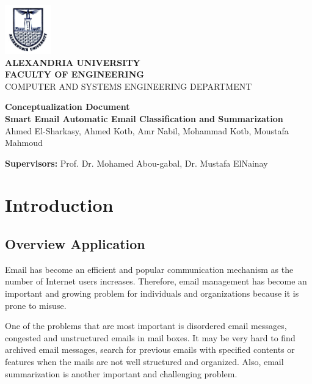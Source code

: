 \documentclass[a4paper,10pt]{article}
\begin{document}
\begin{titlepage}
\vspace{-1.5cm}
\begin{center}
\includegraphics[width=2cm]{Logo_Alexandria_University.jpg}\\
\vspace{1cm}
\textbf{\large ALEXANDRIA UNIVERSITY} \\
\textbf{FACULTY OF ENGINEERING} \\
{\small  COMPUTER AND SYSTEMS ENGINEERING DEPARTMENT}

\vspace{2.5cm}
\textbf{\LARGE Conceptualization Document}\\
\textbf{\small Smart Email Automatic Email Classification and Summarization}\\

\vspace{1cm}
{ Ahmed El-Sharkasy, Ahmed Kotb, Amr Nabil, Mohammad Kotb, Moustafa Mahmoud }
\end{center}

\vspace{1ex}
\textbf{Supervisors:} Prof. Dr. Mohamed Abou-gabal, Dr. Mustafa ElNainay
\end{titlepage}

\newpage
\tableofcontents
\newpage

\section{Introduction}

\subsection{Overview Application}
Email has become an efficient and popular communication mechanism as the number 
of Internet users increases. Therefore, email management has become an important 
and growing problem for individuals and organizations because it is prone to misuse.

One of the problems that are most important is disordered email messages, 
congested and unstructured emails in mail boxes. It may be very hard to 
find archived email messages, search for previous emails with specified contents 
or features when the mails are not well structured and organized. Also, email 
summarization is another important and challenging problem.
\end{document}
